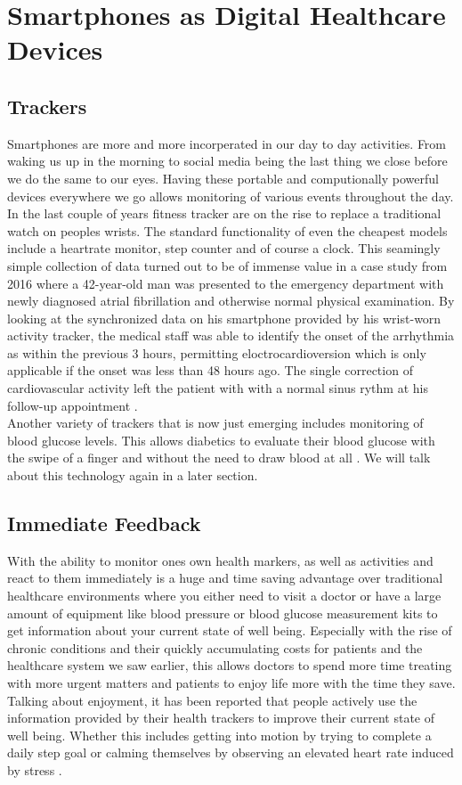 \section{Smartphones as Digital Healthcare Devices}
\label{sec:smartphoneChances}
\subsection{Trackers}
Smartphones are more and more incorperated in our day to day activities. From waking us up in the morning to social media being the last thing we close before we do the same to our eyes. Having these portable and computionally powerful devices everywhere we go allows monitoring of various events throughout the day. In the last couple of years fitness tracker are on the rise to replace a traditional watch on peoples wrists. The standard functionality of even the cheapest models include a heartrate monitor, step counter and of course a clock. This seamingly simple collection of data turned out to be of immense value in a case study from 2016 where a 42-year-old man was presented to the emergency department with newly diagnosed atrial fibrillation and otherwise normal physical examination. By looking at the synchronized data on his smartphone provided by his wrist-worn activity tracker, the medical staff was able to identify the onset of the arrhythmia as within the previous 3 hours, permitting eloctrocardioversion which is only applicable if the onset was less than 48 hours ago. The single correction of cardiovascular activity left the patient with with a normal sinus rythm at his follow-up appointment \cite{rudner2016interrogation}. \\
Another variety of trackers that is now just emerging includes monitoring of blood glucose levels. This allows diabetics to evaluate their blood glucose with the swipe of a finger and without the need to draw blood at all \cite{glucoseTracker}. We will talk about this technology again in a later section.
\subsection{Immediate Feedback}
With the ability to monitor ones own health markers, as well as activities and react to them immediately is a huge and time saving advantage over traditional healthcare environments where you either need to visit a doctor or have a large amount of equipment like blood pressure or blood glucose measurement kits to get information about your current state of well being. Especially with the rise of chronic conditions and their quickly accumulating costs for patients and the healthcare system we saw earlier, this allows doctors to spend more time treating with more urgent matters and patients to enjoy life more with the time they save. Talking about enjoyment, it has been reported that people actively use the information provided by their health trackers to improve their current state of well being. Whether this includes getting into motion by trying to complete a daily step goal \cite{rasche2015activity} or calming themselves by observing an elevated heart rate induced by stress \cite{mayya2015continuous}.
